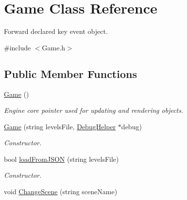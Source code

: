 \hypertarget{class_game}{\section{Game Class Reference}
\label{class_game}
}


Forward declared key event object.  




{\ttfamily \#include $<$Game.\+h$>$}

\subsection*{Public Member Functions}
\begin{DoxyCompactItemize}
\item 
\hypertarget{class_game_ad59df6562a58a614fda24622d3715b65}{\hyperlink{class_game_ad59df6562a58a614fda24622d3715b65}{Game} ()}\label{class_game_ad59df6562a58a614fda24622d3715b65}

\begin{DoxyCompactList}\small\item\em Engine core pointer used for updating and rendering objects. \end{DoxyCompactList}\item 
\hypertarget{class_game_a4d40c0573774dd8f3334d7b568c00b5c}{\hyperlink{class_game_a4d40c0573774dd8f3334d7b568c00b5c}{Game} (string levels\+File, \hyperlink{class_debug_helper}{Debug\+Helper} $\ast$debug)}\label{class_game_a4d40c0573774dd8f3334d7b568c00b5c}

\begin{DoxyCompactList}\small\item\em Constructor. \end{DoxyCompactList}\item 
\hypertarget{class_game_adc5df650d2425ea6c3be9c457af2b702}{bool \hyperlink{class_game_adc5df650d2425ea6c3be9c457af2b702}{load\+From\+J\+S\+O\+N} (string levels\+File)}\label{class_game_adc5df650d2425ea6c3be9c457af2b702}

\begin{DoxyCompactList}\small\item\em Constructor. \end{DoxyCompactList}\item 
\hypertarget{class_game_a2188abf2b6fe1782fd18609065f06948}{void \hyperlink{class_game_a2188abf2b6fe1782fd18609065f06948}{Change\+Scene} (string scene\+Name)}\label{class_game_a2188abf2b6fe1782fd18609065f06948}


\end{DoxyCompactItemize}
